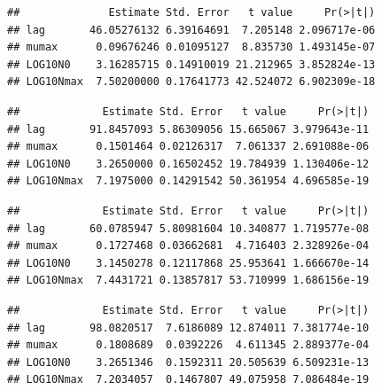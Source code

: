 \documentclass[]{book}
\newenvironment{Shaded}{\begin{snugshade}}{\end{snugshade}}
\newcommand{\KeywordTok}[1]{\textcolor[rgb]{0.13,0.29,0.53}{\textbf{#1}}}
\newcommand{\OperatorTok}[1]{\textcolor[rgb]{0.81,0.36,0.00}{\textbf{#1}}}
\newcommand{\NormalTok}[1]{#1}
\theoremstyle{definition}
\theoremstyle{definition}
\theoremstyle{definition}
\theoremstyle{remark}
\begin{document}
\begin{verbatim}
##              Estimate Std. Error   t value     Pr(>|t|)
## lag       46.05276132 6.39164691  7.205148 2.096717e-06
## mumax      0.09676246 0.01095127  8.835730 1.493145e-07
## LOG10N0    3.16285715 0.14910019 21.212965 3.852824e-13
## LOG10Nmax  7.50200000 0.17641773 42.524072 6.902309e-18
\end{verbatim}

\begin{Shaded}
\end{Shaded}

\begin{verbatim}
##             Estimate Std. Error   t value     Pr(>|t|)
## lag       91.8457093 5.86309056 15.665067 3.979643e-11
## mumax      0.1501464 0.02126317  7.061337 2.691088e-06
## LOG10N0    3.2650000 0.16502452 19.784939 1.130406e-12
## LOG10Nmax  7.1975000 0.14291542 50.361954 4.696585e-19
\end{verbatim}

\begin{Shaded}
\end{Shaded}

\begin{verbatim}
##             Estimate Std. Error   t value     Pr(>|t|)
## lag       60.0785947 5.80981604 10.340877 1.719577e-08
## mumax      0.1727468 0.03662681  4.716403 2.328926e-04
## LOG10N0    3.1450278 0.12117868 25.953641 1.666670e-14
## LOG10Nmax  7.4431721 0.13857817 53.710999 1.686156e-19
\end{verbatim}

\begin{Shaded}
\end{Shaded}

\begin{verbatim}
##             Estimate Std. Error   t value     Pr(>|t|)
## lag       98.0820517  7.6186089 12.874011 7.381774e-10
## mumax      0.1808689  0.0392226  4.611345 2.889377e-04
## LOG10N0    3.2651346  0.1592311 20.505639 6.509231e-13
## LOG10Nmax  7.2034057  0.1467807 49.075958 7.086484e-19
\end{verbatim}
\end{document}
